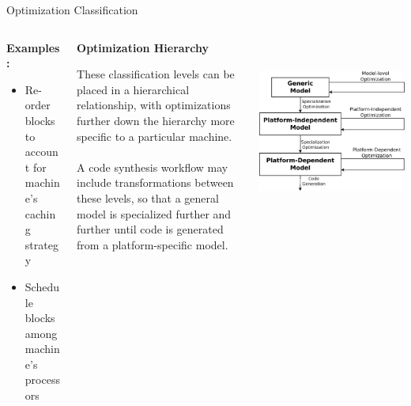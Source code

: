 \documentclass[final,hyperref={pdfpagelabels=false}]{beamer}
\begin{document}
\begin{frame}{}
\begin{block}{Optimization Classification}
\begin{columns}[t,totalwidth=\linewidth]
\begin{column}{.16\linewidth}
           \textbf{Examples:}
           
           \begin{itemize}
           \footnotesize
           \item Re-order blocks to account for machine's caching strategy
           \item Schedule blocks among machine's processors
           \end{itemize}
            \end{column}
            \hspace{-1.2cm}\vrule\hspace{.05cm}
            \begin{column}{.18\linewidth}
            \small
          \begin{center}\textbf{Optimization Hierarchy}\end{center}
          \footnotesize
            These classification levels can be placed in a hierarchical relationship, with optimizations
            further down the hierarchy more specific to a particular machine. \\~\\A code synthesis workflow may include transformations between these levels, so that a general model is specialized further and further until code is generated from a platform-specific model.
            \end{column}
            
            \begin{column}{.20\linewidth}
          ~\\~\\
            \includegraphics[width=\textwidth]{images/hierarchy}
            \end{column}
                        

\end{columns}
\end{block}
\end{frame}
\end{document}
